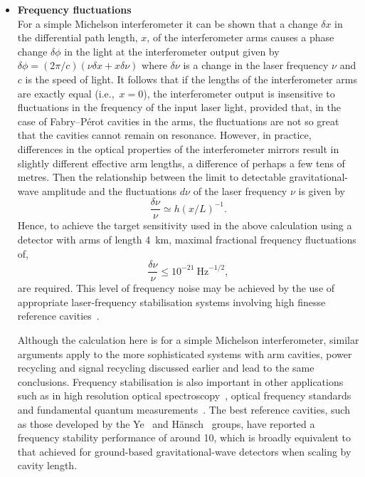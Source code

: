 \documentclass{article}
\begin{document}
\begin{itemize}
%
\item \textbf{Frequency fluctuations} \\
For a simple Michelson interferometer it can be shown that a change $\delta x$
in the differential path length, $x$, of the interferometer arms causes a phase
change $\delta \phi$ in the light at the interferometer output given by $\delta
\phi = (2\pi/c) (\nu \delta x + x \delta\nu)$ where $\delta \nu$ is a change in
the laser frequency $\nu$ and $c$ is the speed of light. It follows that if
the lengths of the interferometer arms are exactly equal (i.e.,\ $x = 0$), the
interferometer output is insensitive to fluctuations in the frequency of the
input laser light, provided that, in the case of Fabry--P\'{e}rot cavities in the
arms, the fluctuations are not so great that the cavities cannot remain on
resonance.  However, in practice, differences in the optical properties of the
interferometer mirrors result in  slightly different effective arm lengths, a
difference of perhaps a few tens of metres. Then the relationship between
the limit to detectable gravitational-wave amplitude and the fluctuations
$d\nu$ of the laser frequency $\nu$ is given by~\cite{Hough}
%
\begin{equation}
  \frac{\delta \nu}{\nu} \simeq h(x/L)^{-1}.
  \label{equation:frequnoise}
\end{equation}
%
Hence, to achieve the target sensitivity used in the above calculation using a
detector with arms of length 4~km, maximal fractional frequency fluctuations of,
%
\begin{equation}
  \frac{\delta \nu}{\nu} \leq 10^{-21} \mathrm{\ Hz}^{-1/2},
  \label{equation:freqspecification}
\end{equation}
%
are required. This level of frequency noise may be achieved by the use of
appropriate laser-frequency stabilisation systems involving high finesse
reference cavities~\cite{Hough}.

Although the calculation here is for a simple Michelson
interferometer, similar arguments apply to the more sophisticated
systems with arm cavities, power recycling and signal recycling
discussed earlier and lead to the same conclusions. Frequency
stabilisation is also important in other applications such as in high
resolution optical spectroscopy~\cite{Rafac:2000}, optical frequency
standards~\cite{Ludlow:2006, Webster:2004} and fundamental quantum
measurements~\cite{Schmidt-Kaler:2003}. The best reference cavities,
such as those developed by the Ye~\cite{Notcutt:2006} and
H\"{a}nsch~\cite{Alnis:2008} groups, have reported a frequency stability
performance of around 10, which is broadly equivalent to that
achieved for ground-based gravitational-wave detectors when scaling by
cavity length.


\end{itemize}
\end{document}
